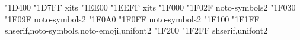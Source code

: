 \documentclass{article}
\begin{document}
              { "1D400} { "1D7FF} {xits}
         { "1EE00} { "1EEFF} {xits}
                                  { "1F000} { "1F02F} {noto-symbols2}
                                   { "1F030} { "1F09F} {noto-symbols2}
                                  { "1F0A0} { "1F0FF} {noto-symbols2}
               { "1F100} { "1F1FF} {shserif,noto-symbols,noto-emoji,unifont2}
                { "1F200} { "1F2FF} {shserif,unifont2}
\end{document}
